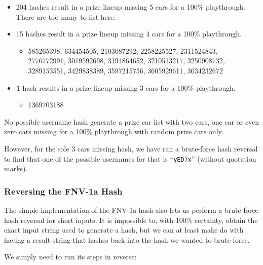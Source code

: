 \documentclass[14pt,a4paper,notitlepage]{extarticle}
\begin{document}
                \begin{itemize}
                    \item 204 hashes result in a prize lineup missing 5 cars for a 100\% playthrough.
                          There are too many to list here.
                    \item 15 hashes result in a prize lineup missing 4 cars for a 100\% playthrough.
                    \begin{itemize}
                        \item 585265398, 634454505, 2103087292, 2258225527, 2311524843,\\ 2776772991, 3019592698, 3194864652, 3210513217, 3250908732,\\ 3289153551, 3429838389, 3597215756, 3605929611, 3634232672
                    \end{itemize}
                    \item \textbf{1} hash results in a prize lineup missing 3 cars for a 100\% playthrough.
                    \begin{itemize}
                        \item 1369703188
                    \end{itemize}
                \end{itemize}

                No possible username hash generate a prize car list with two cars, one car
                or even zero cars missing for a 100\% playthrough with random prize cars only.

                However, for the sole 3 cars missing hash, we have ran a brute-force hash reversal
                to find that one of the possible usernames for that is ``\texttt{yED)x}'' (without quotation
                marks).

            \subsubsection*{Reversing the FNV-1a Hash}
                The simple implementation of the FNV-1a hash also lets us perform a brute-force hash
                reversal for short inputs. It is impossible to, with 100\% certainty, obtain the exact
                input string used to generate a hash, but we can at least make do with having a result
                string that hashes back into the hash we wanted to brute-force.

                We simply need to run its steps in reverse:
\end{document}
